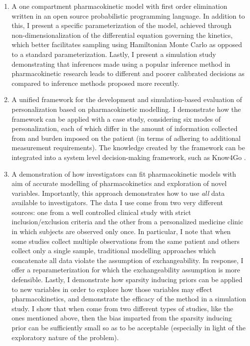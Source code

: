 \begin{enumerate}
	\item  A one compartment pharmacokinetic model with first order elimination written in an open source probabilistic programming language.  In addition to this, I present a specific parameterization of the model, achieved through non-dimensionalization of the differential equation governing the kinetics, which better facilitates sampling using Hamiltonian Monte Carlo as opposed to a standard parameterization.  Lastly, I present a simulation study demonstrating that inferences made using a popular inference method in pharmacokinetic research leads to different and poorer calibrated decisions as compared to inference methods proposed more recently.
	
	\item A unified framework for the development and simulation-based evaluation of personalization based on pharmacokinetic modelling. I demonstrate how the framework can be applied with a case study, considering six modes of personalization, each of which differ in the amount of information collected from  and burden imposed on the patient (in terms of adhering to additional measurement requirements).  The knowledge created by the framework can be integrated into a system level decision-making framework, such as Know4Go \cite{Martin2016}.  
	
	\item A demonstration of how investigators can fit pharmacokinetic models with aim of accurate modelling of pharmacokinetics and exploration of novel variables.  Importantly, this approach demonstrates how to use \textit{all} data available to investigators.  The data I use come from two very different sources:  one from a well controlled clinical study with strict inclusion/exclusion criteria and the other from a personalized medicine clinic in which subjects are observed only once. In particular, I note that when some studies collect multiple observations from the same patient and others collect only a single sample, traditional modelling approaches which concatenate all data violate the assumption of exchangeability. In response, I offer a reparameterization for which the exchangeability assumption is more defensible.  Lastly, I demonstrate how sparsity inducing priors can be applied to new variables in order to explore how those variables may effect pharmacokinetics, and demonstrate the efficacy of the method in a simulation study.  I show that when come from two different types of studies, like the ones mentioned above, then the bias imparted from the sparsity inducing prior can be sufficiently small so as to be acceptable (especially in light of the exploratory nature of the problem). 
\end{enumerate}

